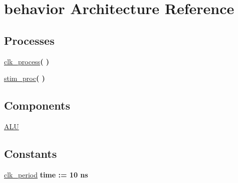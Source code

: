 \hypertarget{class_a_l_u__tb_1_1behavior}{\section{behavior \-Architecture \-Reference}
\label{class_a_l_u__tb_1_1behavior}
}
\*
\*
\subsection*{\-Processes}
 \begin{DoxyCompactItemize}
\item 
\hypertarget{class_a_l_u__tb_1_1behavior_ac5bb218131b813f7908ec89476b31fca}{\hyperlink{class_a_l_u__tb_1_1behavior_ac5bb218131b813f7908ec89476b31fca}{clk\-\_\-process}{\bfseries  (  )}}\label{class_a_l_u__tb_1_1behavior_ac5bb218131b813f7908ec89476b31fca}

\item 
\hypertarget{class_a_l_u__tb_1_1behavior_ad2efa6785cff833c341e27596b21aeb5}{\hyperlink{class_a_l_u__tb_1_1behavior_ad2efa6785cff833c341e27596b21aeb5}{stim\-\_\-proc}{\bfseries  (  )}}\label{class_a_l_u__tb_1_1behavior_ad2efa6785cff833c341e27596b21aeb5}

\end{DoxyCompactItemize}
\subsection*{\-Components}
 \begin{DoxyCompactItemize}
\item 
\hypertarget{class_a_l_u__tb_1_1behavior_a25a9958c95570c64e56bdc97ad3dc777}{\hyperlink{class_a_l_u__tb_1_1behavior_a25a9958c95570c64e56bdc97ad3dc777}{\-A\-L\-U}  {\bfseries }  }\label{class_a_l_u__tb_1_1behavior_a25a9958c95570c64e56bdc97ad3dc777}

\end{DoxyCompactItemize}
\subsection*{\-Constants}
 \begin{DoxyCompactItemize}
\item 
\hypertarget{class_a_l_u__tb_1_1behavior_a76ecbb36f10e5f10094102e221f37f1b}{\hyperlink{class_a_l_u__tb_1_1behavior_a76ecbb36f10e5f10094102e221f37f1b}{clk\-\_\-period} {\bfseries time  \-:=  10  ns } }\label{class_a_l_u__tb_1_1behavior_a76ecbb36f10e5f10094102e221f37f1b}

\end{DoxyCompactItemize}
